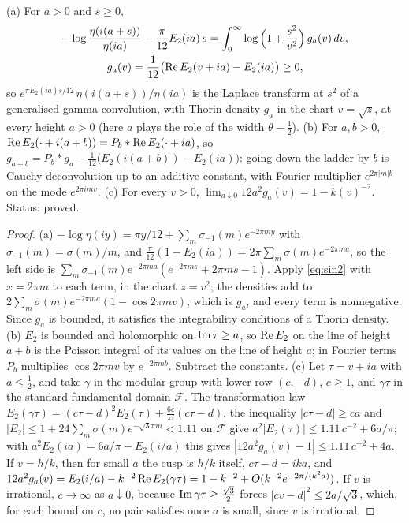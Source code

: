 \begin{proposition}\label{cd:prop:eta}
(a) For $a>0$ and $s\ge0$,
\begin{gather*}
-\log\frac{\eta(i(a+s))}{\eta(ia)}-\frac{\pi}{12}E_2(ia)\,s=\int_0^\infty\log\Big(1+\frac{s^2}{v^2}\Big)\,g_a(v)\,dv,\\
g_a(v)=\frac{1}{12}\bigl(\operatorname{Re} E_2(v+ia)-E_2(ia)\bigr)\ge0,
\end{gather*}
so $e^{\pi E_2(ia)s/12}\,\eta(i(a+s))/\eta(ia)$ is the Laplace transform at $s^2$ of a generalised gamma convolution, with Thorin density $g_a$ in the chart $v=\sqrt z$, at every height $a>0$ (here $a$ plays the role of the width $\theta-\frac12$).
(b) For $a,b>0$, $\operatorname{Re} E_2(\cdot+i(a+b))=P_b*\operatorname{Re} E_2(\cdot+ia)$, so $g_{a+b}=P_b*g_a-\frac1{12}\bigl(E_2(i(a+b))-E_2(ia)\bigr)$: going down the ladder by $b$ is Cauchy deconvolution up to an additive constant, with Fourier multiplier $e^{2\pi|m|b}$ on the mode $e^{2\pi imv}$.
(c) For every $v>0$, $\lim_{a\downarrow0}12a^2g_a(v)=1-k(v)^{-2}$.
Status: proved.
\end{proposition}

\begin{proof}
(a) $-\log\eta(iy)=\pi y/12+\sum_m\sigma_{-1}(m)e^{-2\pi my}$ with $\sigma_{-1}(m)=\sigma(m)/m$, and $\frac\pi{12}(1-E_2(ia))=2\pi\sum_m\sigma(m)e^{-2\pi ma}$, so the left side is $\sum_m\sigma_{-1}(m)e^{-2\pi ma}(e^{-2\pi ms}+2\pi ms-1)$. Apply \eqref{eq:sin2} with $x=2\pi m$ to each term, in the chart $z=v^2$; the densities add to $2\sum_m\sigma(m)e^{-2\pi ma}(1-\cos2\pi mv)$, which is $g_a$, and every term is nonnegative. Since $g_a$ is bounded, it satisfies the integrability conditions of a Thorin density. (b) $E_2$ is bounded and holomorphic on $\operatorname{Im}\tau\ge a$, so $\operatorname{Re} E_2$ on the line of height $a+b$ is the Poisson integral of its values on the line of height $a$; in Fourier terms $P_b$ multiplies $\cos2\pi mv$ by $e^{-2\pi mb}$. Subtract the constants. (c) Let $\tau=v+ia$ with $a\le\frac12$, and take $\gamma$ in the modular group with lower row $(c,-d)$, $c\ge1$, and $\gamma\tau$ in the standard fundamental domain $\mathcal F$. The transformation law $E_2(\gamma\tau)=(c\tau-d)^2E_2(\tau)+\frac{6c}{\pi i}(c\tau-d)$, the inequality $|c\tau-d|\ge ca$ and $|E_2|\le1+24\sum_m\sigma(m)e^{-\sqrt3\pi m}<1.11$ on $\mathcal F$ give $a^2|E_2(\tau)|\le1.11\,c^{-2}+6a/\pi$; with $a^2E_2(ia)=6a/\pi-E_2(i/a)$ this gives $|12a^2g_a(v)-1|\le1.11\,c^{-2}+4a$. If $v=h/k$, then for small $a$ the cusp is $h/k$ itself, $c\tau-d=ika$, and $12a^2g_a(v)=E_2(i/a)-k^{-2}\operatorname{Re} E_2(\gamma\tau)=1-k^{-2}+O(k^{-2}e^{-2\pi/(k^2a)})$. If $v$ is irrational, $c\to\infty$ as $a\downarrow0$, because $\operatorname{Im}\gamma\tau\ge\frac{\sqrt3}2$ forces $|cv-d|^2\le2a/\sqrt3$, which, for each bound on $c$, no pair satisfies once $a$ is small, since $v$ is irrational.
\end{proof}

